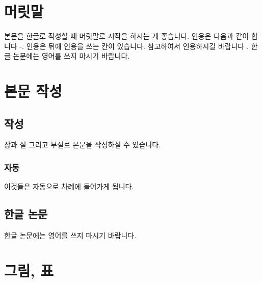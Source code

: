 \documentclass[master,english,final]{kaist-ucs} %
\begin{document}
    \addtocounter{pagemarker}{1}                 %
    \newpage  
  


    \tableofcontents

    \listoftables

    \listoffigures


\chapter{머릿말}
본문을 한글로 작성할 때 머릿말로 시작을 하시는 게 좋습니다. \cite{FD1}
인용은 다음과 같이 합니다 \cite{RVP1}-\cite{ML2}.
인용은 뒤에 인용을 쓰는 칸이 있습니다. 참고하여서 인용하시길 바랍니다 \cite{SOCA2,EF2}.
한글 논문에는 영어를 쓰지 마시기 바랍니다. 



\chapter{본문 작성}

\section{작성}

장과 절 그리고 부절로 본문을 작성하실 수 있습니다.

\subsection{자동}

이것들은 자동으로 차례에 들어가게 됩니다.

\section{한글 논문}

한글 논문에는 영어를 쓰지 마시기 바랍니다.

\chapter{그림, 표}
\end{document}
